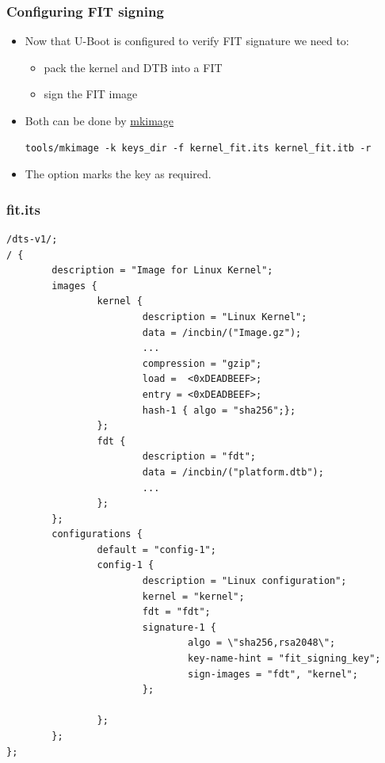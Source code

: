 \begin{frame}[fragile]
  \frametitle{Configuring FIT signing}
  \begin{itemize}
    \item Now that U-Boot is configured to verify FIT signature we need to:
    \begin{itemize}
      \item pack the kernel and DTB into a FIT
      \item sign the FIT image
    \end{itemize}
    \item Both can be done by \href{https://elixir.bootlin.com/u-boot/v2026.01/source/tools/mkimage.c}{mkimage}
    \begin{verbatim}
tools/mkimage -k keys_dir -f kernel_fit.its kernel_fit.itb -r
    \end{verbatim}
    \item The  option marks the key as required.
  \end{itemize}
\end{frame}

\begin{frame}[fragile]
  \frametitle{fit.its}
  \begin{verbatim}
/dts-v1/;
/ {
        description = "Image for Linux Kernel";
        images {
                kernel {
                        description = "Linux Kernel";
                        data = /incbin/("Image.gz");
                        ...
                        compression = "gzip";
                        load =  <0xDEADBEEF>;
                        entry = <0xDEADBEEF>;
                        hash-1 { algo = "sha256";};
                };
                fdt {
                        description = "fdt";
                        data = /incbin/("platform.dtb");
                        ...
                };
        };
        configurations {
                default = "config-1";
                config-1 {
                        description = "Linux configuration";
                        kernel = "kernel";
                        fdt = "fdt";
                        signature-1 {
                                algo = \"sha256,rsa2048\";
                                key-name-hint = "fit_signing_key";
                                sign-images = "fdt", "kernel";
                        };

                };
        };
};
  \end{verbatim}
\end{frame}

